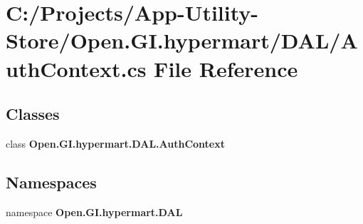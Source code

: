 \section{C\+:/\+Projects/\+App-\/\+Utility-\/\+Store/\+Open.G\+I.\+hypermart/\+D\+A\+L/\+Auth\+Context.cs File Reference}
\label{_auth_context_8cs}
\subsection*{Classes}
\begin{DoxyCompactItemize}
\item 
class \textbf{ Open.\+G\+I.\+hypermart.\+D\+A\+L.\+Auth\+Context}
\end{DoxyCompactItemize}
\subsection*{Namespaces}
\begin{DoxyCompactItemize}
\item 
namespace \textbf{ Open.\+G\+I.\+hypermart.\+D\+AL}
\end{DoxyCompactItemize}
